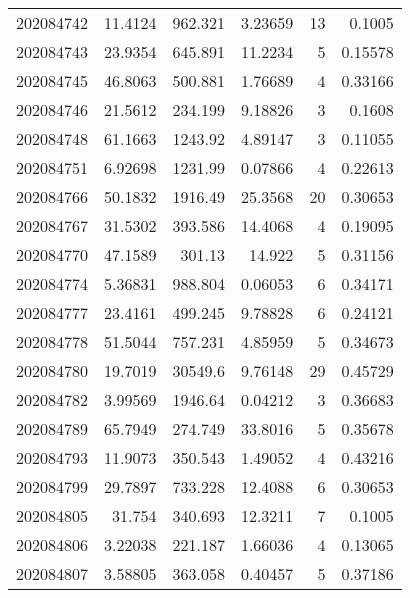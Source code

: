 \begin{tabular}{rrrrrr}
 202084742 &         11.4124  &      962.321  &            3.23659 &          13 & 0.1005  \\
 202084743 &         23.9354  &      645.891  &           11.2234  &           5 & 0.15578 \\
 202084745 &         46.8063  &      500.881  &            1.76689 &           4 & 0.33166 \\
 202084746 &         21.5612  &      234.199  &            9.18826 &           3 & 0.1608  \\
 202084748 &         61.1663  &     1243.92   &            4.89147 &           3 & 0.11055 \\
 202084751 &          6.92698 &     1231.99   &            0.07866 &           4 & 0.22613 \\
 202084766 &         50.1832  &     1916.49   &           25.3568  &          20 & 0.30653 \\
 202084767 &         31.5302  &      393.586  &           14.4068  &           4 & 0.19095 \\
 202084770 &         47.1589  &      301.13   &           14.922   &           5 & 0.31156 \\
 202084774 &          5.36831 &      988.804  &            0.06053 &           6 & 0.34171 \\
 202084777 &         23.4161  &      499.245  &            9.78828 &           6 & 0.24121 \\
 202084778 &         51.5044  &      757.231  &            4.85959 &           5 & 0.34673 \\
 202084780 &         19.7019  &    30549.6    &            9.76148 &          29 & 0.45729 \\
 202084782 &          3.99569 &     1946.64   &            0.04212 &           3 & 0.36683 \\
 202084789 &         65.7949  &      274.749  &           33.8016  &           5 & 0.35678 \\
 202084793 &         11.9073  &      350.543  &            1.49052 &           4 & 0.43216 \\
 202084799 &         29.7897  &      733.228  &           12.4088  &           6 & 0.30653 \\
 202084805 &         31.754   &      340.693  &           12.3211  &           7 & 0.1005  \\
 202084806 &          3.22038 &      221.187  &            1.66036 &           4 & 0.13065 \\
 202084807 &          3.58805 &      363.058  &            0.40457 &           5 & 0.37186 \\

\end{tabular}
